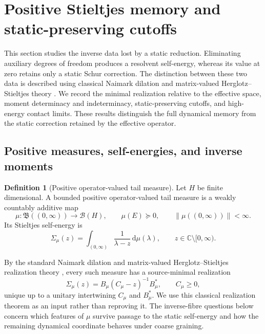 \documentclass[11pt]{article}
\theoremstyle{definition}
\newtheorem{definition}[definition]{Definition}
\theoremstyle{remark}
\theoremstyle{definition}
\theoremstyle{remark}
\newcommand{\dd}{\mathrm d}
\begin{document}
\section{Positive Stieltjes memory and static-preserving cutoffs}
\label{app:memory-details}

This section studies the inverse data lost by a static reduction.
Eliminating auxiliary degrees of
freedom produces a resolvent self-energy, whereas its value at zero retains
only a static Schur correction.  The distinction between these two data is
described using classical Naimark dilation and matrix-valued
Herglotz--Stieltjes theory
\cite{Holevo1982,GesztesyTsekanovskii2000,KreinNudelman1977}.
We record the minimal realization relative to the effective space, moment
determinacy and indeterminacy, static-preserving cutoffs, and high-energy
contact limits.  These results distinguish the full dynamical memory from
the static correction retained by the effective operator.

\subsection{Positive measures, self-energies, and inverse moments}
\label{subsec:dynamic-memory}

\begin{definition}[Positive operator-valued tail measure]
\label{def:supp-POVM}
Let $H$ be finite dimensional.  A bounded positive operator-valued tail
measure is a weakly countably additive map
\[
 \mu:\mathfrak B((0,\infty))\to\mathcal B(H),
 \qquad
 \mu(E)\succeq0,
 \qquad
 \|\mu((0,\infty))\|<\infty.
\]
Its Stieltjes self-energy is
\begin{equation}
 {
 \Sigma_\mu(z)
 =\int_{(0,\infty)}
  \frac{1}{\lambda-z}\,\dd\mu(\lambda),
 \qquad z\in\mathbb C\setminus[0,\infty).}
 \label{eq:supp-Stieltjes}
\end{equation}
\end{definition}

By the standard Naimark dilation and matrix-valued Herglotz--Stieltjes realization
theory \cite{Holevo1982,GesztesyTsekanovskii2000,KreinNudelman1977}, every such
measure has a source-minimal realization
\begin{equation}
 \Sigma_\mu(z)=B_\mu(C_\mu-z)^{-1}B_\mu^*,
 \qquad C_\mu\ge0,
 \label{eq:supp-Naimark-realization}
\end{equation}
unique up to a unitary intertwining $C_\mu$ and $B_\mu^*$.  We use this classical
realization theorem as an input rather than reproving it.  The inverse-fibre questions
below concern which features of $\mu$ survive passage to the static self-energy and how the
remaining dynamical coordinate behaves under coarse graining.
\end{document}
